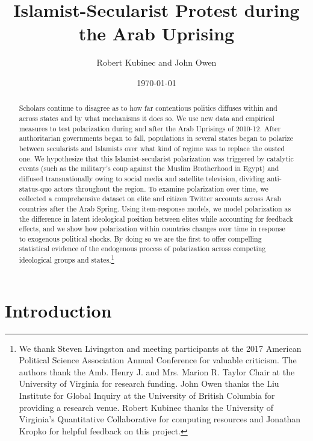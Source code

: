 \documentclass[12pt]{article}
\author{Robert Kubinec and John Owen}
\affil{\small Department of Politics \\
	\small University of Virginia}
\date{\small \today}
\title{Islamist-Secularist Protest during the Arab Uprising}
\begin{document}
\maketitle

	\begin{abstract}
		Scholars continue to disagree as to how far contentious politics diffuses within and across states and by what mechanisms it does so. We use new data and empirical measures to test polarization during and after the Arab Uprisings of 2010-12. After authoritarian governments began to fall, populations in several states began to polarize between secularists and Islamists over what kind of regime was to replace the ousted one. We hypothesize that this Islamist-secularist polarization was triggered by catalytic events (such as the military's coup against the Muslim Brotherhood in Egypt) and diffused transnationally owing to social media and satellite television, dividing anti-status-quo actors throughout the region. To examine polarization over time, we collected a comprehensive dataset on elite and citizen Twitter accounts across Arab countries after the Arab Spring. Using item-response models, we model polarization as the difference in latent ideological position between elites while accounting for feedback effects, and we show how polarization within countries changes over time in response to exogenous political shocks. By doing so we are the first to offer compelling statistical evidence of the endogenous process of polarization across competing ideological groups and states.\footnote{\linespread{.5} We thank Steven Livingston and meeting participants at the 2017 American Political Science Association Annual Conference for valuable criticism. The authors thank the Amb. Henry J. and Mrs. Marion R. Taylor Chair at the University of Virginia for research funding.  John Owen thanks the Liu Institute for Global Inquiry at the University of British Columbia for providing a research venue. Robert Kubinec thanks the University of Virginia's Quantitative Collaborative for computing resources and Jonathan Kropko for helpful feedback on this project.}
	\end{abstract}

	\section*{Introduction}
\end{document}
